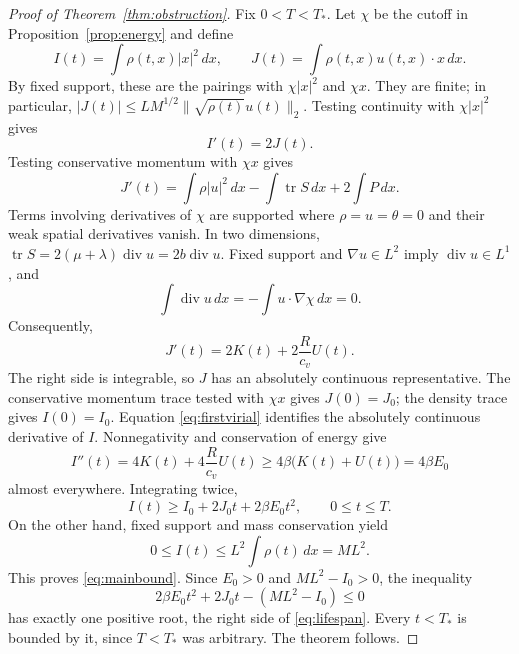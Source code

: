 \documentclass[10pt,twoside]{article}
\newcommand{\dd}{\,dx}
\newcommand{\Div}{\operatorname{div}}
\newcommand{\norm}[2]{\lVert#1\rVert_{#2}}
\begin{document}
\begin{proof}[Proof of Theorem~\ref{thm:obstruction}]
Fix $0<T<T_*$. Let $\chi$ be the cutoff in
Proposition~\ref{prop:energy} and define
\[
 I(t)=\int\rho(t,x)|x|^2\dd,\qquad
 J(t)=\int\rho(t,x)u(t,x)\cdot x\dd.
\]
By fixed support, these are the pairings with $\chi|x|^2$ and
$\chi x$. They are finite; in particular,
$|J(t)|\le L M^{1/2}\norm{\sqrt{\rho(t)}u(t)}{2}$.
Testing continuity with $\chi|x|^2$ gives
\begin{equation}
 I'(t)=2J(t).
 \label{eq:firstvirial}
\end{equation}
Testing conservative momentum with $\chi x$ gives
\begin{equation}
 J'(t)=\int\rho|u|^2\dd-\int\operatorname{tr}S\dd
                                      +2\int P\dd.
 \label{eq:secondvirial}
\end{equation}
Terms involving derivatives of $\chi$ are supported where
$\rho=u=\theta=0$ and their weak spatial derivatives vanish.
In two dimensions,
$\operatorname{tr}S=2(\mu+\lambda)\Div u=2b\Div u$.
Fixed support and $\nabla u\in L^2$ imply $\Div u\in L^1$, and
\[
 \int\Div u\dd=-\int u\cdot\nabla\chi\dd=0.
\]
Consequently,
\begin{equation}
 J'(t)=2K(t)+2\frac{R}{c_v}U(t).
 \label{eq:momentumvirial}
\end{equation}
The right side is integrable, so $J$ has an absolutely continuous
representative. The conservative momentum trace tested with $\chi x$
gives $J(0)=J_0$; the density trace gives $I(0)=I_0$.
Equation \eqref{eq:firstvirial} identifies the absolutely continuous
derivative of $I$. Nonnegativity and conservation of energy give
\begin{equation}
 I''(t)=4K(t)+4\frac{R}{c_v}U(t)
       \ge4\beta\bigl(K(t)+U(t)\bigr)=4\beta E_0
 \label{eq:virialacceleration}
\end{equation}
almost everywhere. Integrating twice,
\begin{equation}
 I(t)\ge I_0+2J_0t+2\beta E_0t^2,\qquad 0\le t\le T.
 \label{eq:quadraticgrowth}
\end{equation}
On the other hand, fixed support and mass conservation yield
\begin{equation}
 0\le I(t)\le L^2\int\rho(t)\dd=ML^2.
 \label{eq:momentupper}
\end{equation}
This proves \eqref{eq:mainbound}. Since $E_0>0$ and
$ML^2-I_0>0$, the inequality
\[
 2\beta E_0t^2+2J_0t-(ML^2-I_0)\le0
\]
has exactly one positive root, the right side of \eqref{eq:lifespan}.
Every $t<T_*$ is bounded by it, since $T<T_*$ was arbitrary.
The theorem follows.
\end{proof}
\end{document}
